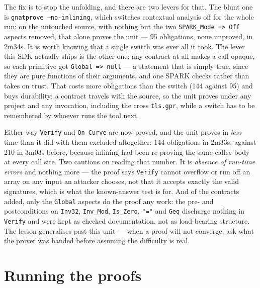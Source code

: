 The fix is to stop the unfolding, and there are two levers for that. The blunt one is
\texttt{gnatprove --no-inlining}, which switches contextual analysis off for the whole run:
on the untouched source, with nothing but the two \lstinline{SPARK_Mode => Off} aspects
removed, that alone proves the unit --- 95 obligations, none unproved, in 2m34s. It is
worth knowing that a single switch was ever all it took. The lever this SDK actually
ships is the other one: any contract at all makes a call opaque, so each primitive got
\lstinline{Global => null} --- a statement that is simply true, since they are pure
functions of their arguments, and one SPARK checks rather than takes on trust. That costs
more obligations than the switch (144 against 95) and buys durability: a contract travels
with the source, so the unit proves under any project and any invocation, including the
cross \lstinline{tls.gpr}, while a switch has to be remembered by whoever runs the tool
next.

Either way \lstinline{Verify} and \lstinline{On_Curve} are now proved, and the unit proves
in \emph{less} time than it did with them excluded altogether: 144 obligations in 2m33s,
against 210 in 3m03s before, because inlining had been re-proving the same callee body at
every call site. Two cautions on reading that number. It is \emph{absence of run-time
errors} and nothing more --- the proof says \lstinline{Verify} cannot overflow or run off
an array on any input an attacker chooses, not that it accepts exactly the valid
signatures, which is what the known-answer test is for. And of the contracts added, only
the \lstinline{Global} aspects do the proof any work: the pre- and postconditions on
\lstinline{Inv32}, \lstinline{Inv_Mod}, \lstinline{Is_Zero}, \lstinline{"="} and
\lstinline{Geq} discharge nothing in \lstinline{Verify} and were kept as checked
documentation, not as load-bearing structure. The lesson generalises past this unit ---
when a proof will not converge, ask what the prover was handed before assuming the
difficulty is real.

\section{Running the proofs}


